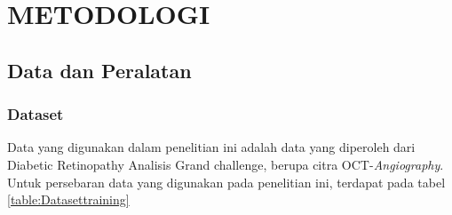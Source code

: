 \chapter{METODOLOGI}
\label{chap:3}


\section{Data dan Peralatan}
\label{sec:31}

\subsection{Dataset}
\label{sec:311}
Data yang digunakan dalam penelitian ini adalah data yang diperoleh dari Diabetic Retinopathy Analisis Grand challenge, berupa citra OCT-\emph{Angiography}.
Untuk persebaran data yang digunakan pada penelitian ini, terdapat pada tabel \ref{table:Datasettraining}

